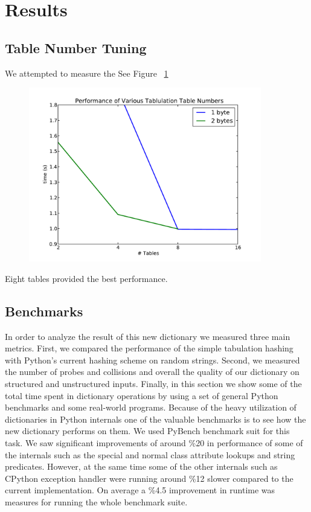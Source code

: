 \documentclass[11pt]{article}
\begin{document}
\section{Results}

\subsection{Table Number Tuning}
       
We attempted to measure the 
See Figure ~\ref{fig:tables}
 \begin{figure}[H]
   \centering
   \includegraphics[width=4in]{tables.pdf}
   \caption{}
   \label{fig:tables}
 \end{figure}
       
Eight tables provided the best performance.
\subsection{Benchmarks}
In order to analyze the result of this new dictionary we measured three main metrics. First, we compared the performance of the simple tabulation hashing with Python’s current hashing scheme on random strings. Second, we measured the number of probes and collisions and overall the quality of our dictionary on structured and unstructured inputs. Finally, in this section  we show some of the total time spent in dictionary operations by using a set of general Python benchmarks and some real-world programs.
Because of the heavy utilization of dictionaries in Python internals one of the valuable benchmarks is to see how the new dictionary performs on them. We used PyBench benchmark suit for this task. We saw significant improvements of around \%20 in performance of some of the internals such as the special and normal class attribute lookups and string predicates. However, at the same time some of the other internals such as CPython exception handler were running around \%12 slower compared to the current implementation. On average a \%4.5 improvement in runtime was measures for running the whole benchmark suite.
\end{document}

